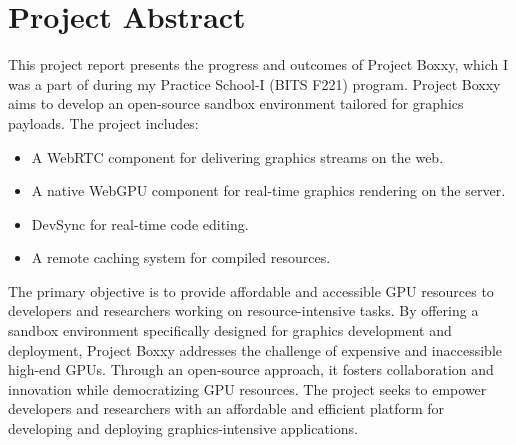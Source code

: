 
\chapter{Project Abstract} %

\label{Chapter0} %


This project report presents the progress and outcomes of Project Boxxy, which I was a part of during my Practice School-I (BITS F221) program.
Project Boxxy aims to develop an open-source sandbox environment tailored for graphics payloads.
The project includes:
\begin{itemize}
    \item A WebRTC component for delivering graphics streams on the web.
    \item A native WebGPU component for real-time graphics rendering on the server.
    \item DevSync for real-time code editing.
    \item A remote caching system for compiled resources.
\end{itemize}
The primary objective is to provide affordable and accessible GPU resources to developers and researchers working on resource-intensive tasks. By offering a sandbox environment specifically designed for graphics development and deployment, Project Boxxy addresses the challenge of expensive and inaccessible high-end GPUs.
Through an open-source approach, it fosters collaboration and innovation while democratizing GPU resources. The project seeks to empower developers and researchers with an affordable and efficient platform for developing and deploying graphics-intensive applications.